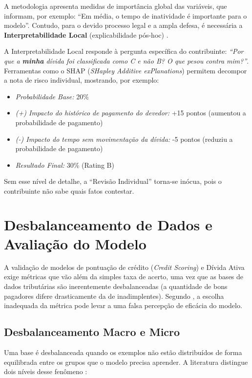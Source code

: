 A metodologia apresenta medidas de importância global das variáveis, que informam, por exemplo: ``Em média, o tempo de inatividade é importante para o modelo''. Contudo, para o devido processo legal e a ampla defesa, é necessária a \textbf{Interpretabilidade Local} (explicabilidade pós-hoc) \cite{lundbergUnifiedApproachInterpreting2017}.

A Interpretabilidade Local responde à pergunta específica do contribuinte: \textit{``Por que a \textbf{minha} dívida foi classificada como C e não B?  O que pesou contra mim?''}. Ferramentas como o SHAP (\textit{SHapley Additive exPlanations}) permitem decompor a nota de risco individual, mostrando, por exemplo:
\begin{itemize}
    \item \textit{Probabilidade Base:} 20\%
    \item \textit{(+) Impacto do histórico de pagamento do devedor:} +15 pontos (aumentou a probabilidade de pagamento)
    \item \textit{(-) Impacto do tempo sem movimentação da dívida:} -5 pontos (reduziu a probabilidade de pagamento)
    \item \textit{Resultado Final:} 30\% (Rating B)
\end{itemize}
Sem esse nível de detalhe, a ``Revisão Individual'' torna-se inócua, pois o contribuinte não sabe quais fatos contestar.



\section{Desbalanceamento de Dados e Avaliação do Modelo}
\label{sec:metricas}

A validação de modelos de pontuação de crédito (\textit{Credit Scoring}) e Dívida Ativa exige métricas que vão além da simples taxa de acerto, uma vez que as bases de dados tributárias são inerentemente desbalanceadas (a quantidade de bons pagadores difere drasticamente da de inadimplentes). Segundo , a escolha inadequada da métrica pode levar a uma falsa percepção de eficácia do modelo.

\subsection{Desbalanceamento Macro e Micro}
\label{subsec:desbalanceamento}

Uma base é desbalanceada quando os exemplos não estão distribuídos de forma equilibrada entre os grupos que o modelo precisa aprender. A literatura distingue dois níveis desse fenômeno \cite{heLearningImbalancedData2009}:

